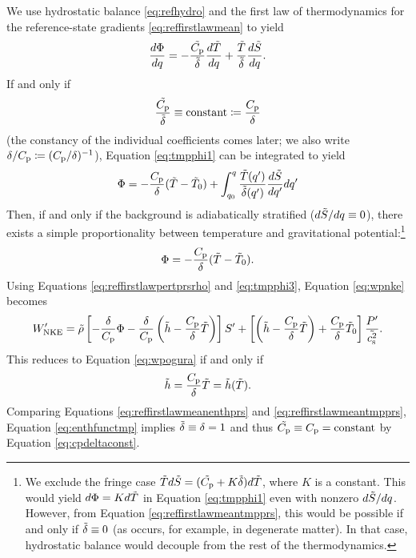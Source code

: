 \documentclass[12pt]{article}
\newcommand{\wpnke}{W^\prime_{\rm NKE}}
\begin{document}
We use hydrostatic balance \eqref{eq:refhydro} and the first law of thermodynamics for the reference-state gradients \eqref{eq:reffirstlawmean} to yield
\begin{align}\label{eq:tmpphi1}
	\frac{d\Phi}{dq} = -\frac{\tilde{C_{\rm{p}}}}{\tilde{\delta}}\frac{d\tilde{T}}{dq} + \frac{\tilde{T}}{\tilde{\delta}}\frac{d\tilde{S}}{dq}.
\end{align}
If and only if 
\begin{align}\label{eq:cpdeltaconst}
	\frac{\tilde{C_{\rm{p}}}}{\tilde{\delta}} \equiv \text{constant} \coloneqq \frac{C_{\rm{p}}}{\delta}
\end{align}
(the constancy of the individual coefficients comes later; we also write $\delta/C_{\rm{p}}\coloneqq(C_{\rm{p}}/\delta)^{-1}$), Equation \eqref{eq:tmpphi1} can be integrated to yield
\begin{align}\label{eq:tmpphi2}
	\Phi = -\frac{C_{\rm{p}}}{\delta}(\tilde{T}-\tilde{T}_0) + \int_{q_0}^q\frac{\tilde{T}(q^\prime)}{\tilde{\delta}(q^\prime)}\frac{d\tilde{S}}{dq^\prime}dq^\prime
\end{align}
Then, if and only if the background is adiabatically stratified ($d\tilde{S}/dq\equiv0$), there exists a simple proportionality between temperature and gravitational potential:\footnote{We exclude the fringe case $\tilde{T} d\tilde{S} = (\tilde{C_{\rm{p}}} + K \tilde{\delta})d\tilde{T}$, where $K$ is a constant. This would yield $d\Phi = K d\tilde{T}$ in Equation \eqref{eq:tmpphi1} even with nonzero $d\tilde{S}/dq$. However, from Equation \eqref{eq:reffirstlawmeantmpprs}, this would be possible if and only if $\tilde{\delta}\equiv0$ (as occurs, for example, in degenerate matter). In that case, hydrostatic balance would decouple from the rest of the thermodynamics.}
\begin{align}\label{eq:tmpphi3}
	\Phi = -\frac{C_{\rm{p}}}{\delta}(\tilde{T}-\tilde{T}_0).
\end{align}
Using Equations \eqref{eq:reffirstlawpertprsrho} and \eqref{eq:tmpphi3}, Equation \eqref{eq:wpnke} becomes
\begin{align}\label{eq:wpnke2}
	\wpnke = \rhotilde\left[-\frac{\delta}{\cpcap}\Phi - \frac{\delta}{\cpcap}\left(\enthtilde - \frac{\cpcap}{\delta}\tmptilde\right)\right] \entrprime +\left[\left(\enthtilde-\frac{\cpcap}{\delta}\tmptilde\right) + \frac{\cpcap}{\delta}\tmptilde_0\right]\frac{\prsprime}{\cssqtilde}.
\end{align}
This reduces to Equation \eqref{eq:wpogura} if and only if 
\begin{align}\label{eq:enthfunctmp}
	\tilde{h} = \frac{C_{\rm{p}}}{\delta}\tilde{T} = \tilde{h}(\tilde{T}). 
\end{align}
Comparing Equations \eqref{eq:reffirstlawmeanenthprs} and \eqref{eq:reffirstlawmeantmpprs}, Equation \eqref{eq:enthfunctmp} implies $\tilde{\delta}\equiv\delta=1$ and thus $\tilde{C_{\rm{p}}}\equiv C_{\rm{p}}=\text{constant}$ by Equation \eqref{eq:cpdeltaconst}.  
\end{document}
